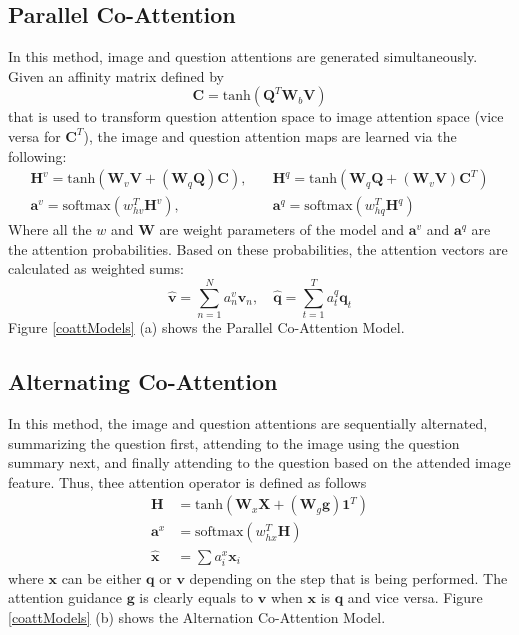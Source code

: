\documentclass{article}
\begin{document}
\subsection{Parallel Co-Attention}
In this method, image and question attentions are generated simultaneously. Given an affinity matrix defined by
\begin{equation*}
    \bm{C} = \text{tanh}(\bm{Q}^T\bm{W}_b\bm{V})
\end{equation*}
that is used to transform question attention space to image attention space (vice versa for $\bm{C}^T$), the image and question attention maps are learned via the following:
\begin{align*}
    \bm{H}^v = \text{tanh}(\bm{W}_v\bm{V} + (\bm{W}_q\bm{Q})\bm{C}), &\quad \bm{H}^q = \text{tanh}(\bm{W}_q\bm{Q} + (\bm{W}_v\bm{V})\bm{C}^T)\\
    \bm{a}^v = \text{softmax}(w_{hv}^T\bm{H}^v), &\quad \bm{a}^q = \text{softmax}(w_{hq}^T\bm{H}^q)
\end{align*}
Where all the $w$ and $\bm{W}$ are weight parameters of the model and $\bm{a}^v$ and $\bm{a}^q$ are the attention probabilities. Based on these probabilities, the attention vectors are calculated as weighted sums:
\begin{equation*}
    \hat{\bm{v}} = \sum_{n=1}^Na_n^v\bm{v}_n, \quad \hat{\bm{q}} = \sum_{t=1}^Ta_t^q\bm{q}_t
\end{equation*}
Figure \ref{coattModels} (a) shows the Parallel Co-Attention Model.
\subsection{Alternating Co-Attention}
In this method, the image and question attentions are sequentially alternated, summarizing the question first, attending to the image using the question summary next, and finally attending to the question based on the attended image feature. Thus, thee attention operator is defined as follows
\begin{align*}
    \bm{H} &= \text{tanh}(\bm{W}_x\bm{X} + (\bm{W}_g\bm{g})\bm{1}^T)\\
    \bm{a}^x &= \text{softmax}(w_{hx}^T\bm{H})\\
    \hat{\bm{x}} &= \sum a_i^x\bm{x}_i
\end{align*}
where $\bm{x}$ can be either $\bm{q}$ or $\bm{v}$ depending on the step that is being performed. The attention guidance $\bm{g}$ is clearly equals to $\bm{v}$ when $\bm{x}$ is $\bm{q}$ and vice versa.
Figure \ref{coattModels} (b) shows the Alternation Co-Attention Model.
\end{document}
